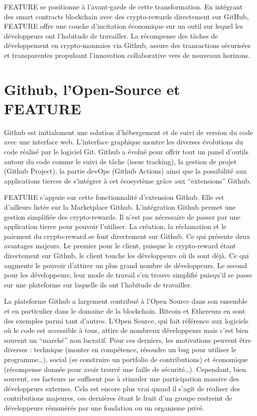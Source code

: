 \documentclass[
	a4paper, %
	10pt, %
	unnumberedsections, %
	twoside, %
]{LTJournalArticle}
\begin{document}
FEATURE se positionne à l'avant-garde de cette transformation. En intégrant des smart contracts blockchain avec des crypto-rewards directement sur GitHub, FEATURE offre une couche d'incitation économique sur un outil sur lequel les développeurs ont l’habitude de travailler. La récompense des tâches de développement en crypto-monnaies via Github, assure des transactions sécurisées et transparentes propulsant l'innovation collaborative vers de nouveaux horizons.


\section{Github, l’Open-Source et FEATURE}

Github est initialement une solution d’hébergement et de suivi de version du code avec une interface web. L’interface graphique montre les diverses évolutions du code réalisé par le logiciel Git. Github a évolué pour offrir tout un panel d’outils autour du code comme le suivi de tâche (issue tracking), la gestion de projet (Github Project), la partie devOps (Github Actions) ainsi que la possibilité aux applications tierces de s’intégrer à cet écosystème grâce aux “extensions” Github.

FEATURE s'appuie sur cette fonctionnalité d’extension Github. Elle est d’ailleurs listée sur la Marketplace Github. L’intégration Github permet une gestion simplifiée des crypto-rewards. Il n’est pas nécessaire de passer par une application tierce pour pouvoir l’utiliser. La création, la réclamation et le paiement du crypto-reward se font directement sur Github. Ce qui présente deux avantages majeurs. Le premier pour le client, puisque le crypto-reward étant directement sur Github, le client touche les développeurs où ils sont déjà. Ce qui augmente le pouvoir d’attirer un plus grand nombre de développeurs. Le second pour les développeurs, leur mode de travail s’en trouve simplifié puisqu’il se passe sur une plateforme sur laquelle ils ont l’habitude de travailler.

La plateforme Github a largement contribué à l’Open Source dans son ensemble et en particulier dans le domaine de la blockchain. Bitcoin et Ethereum en sont des exemples parmi tant d’autres. L'Open Source, qui fait référence aux logiciels où le code est accessible à tous, attire de nombreux développeurs mais c’est bien souvent un “marché” non lucratif.  Pour ces derniers, les motivations peuvent être diverses : technique (monter en compétence, résoudre un bug pour utiliser le programme…), social (se construire un portfolio de contributions) et économique (récompense donnée pour avoir trouvé une faille de sécurité…). Cependant, bien souvent, ces facteurs ne suffisent pas à stimuler une participation massive des développeurs externes. Cela est encore plus vrai quand il s’agit de réaliser des contributions majeures, ces dernières étant le fruit d’un groupe restreint de développeurs rémunérés par une fondation ou un organisme privé.
\end{document}
